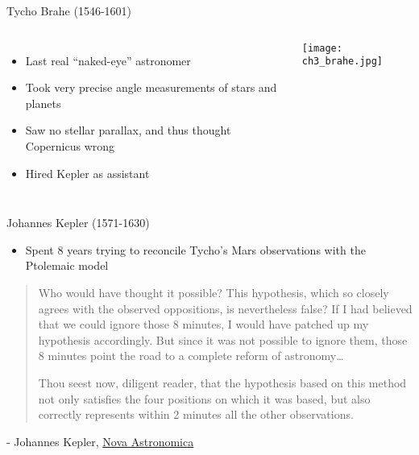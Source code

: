 \documentclass[pdf, aspectratio=169]{beamer}
\begin{document}
\begin{frame}{Tycho Brahe (1546-1601)}
  \begin{columns}
	\begin{itemize}
	  \item Last real ``naked-eye'' astronomer
	  \item Took very precise angle measurements of stars and planets
	  \item Saw no stellar parallax, and thus thought Copernicus wrong
	  \item Hired Kepler as assistant
	\end{itemize}
	\begin{center}
	  \texttt{[image: ch3\_brahe.jpg]}
	\end{center}
  \end{columns}
\end{frame}

\begin{frame}{Johannes Kepler (1571-1630)}
  \begin{itemize}
	\item Spent 8 years trying to reconcile Tycho's Mars observations with the Ptolemaic model
  \end{itemize}
  \begin{quotation}
	Who would have thought it possible? This
hypothesis, which so closely agrees with the
observed oppositions, is nevertheless false? If I
had believed that we could ignore those 8 minutes, I
would have patched up my hypothesis accordingly.
But since it was not possible to ignore them,
those 8 minutes point the road to a complete
reform of astronomy\ldots

Thou seest now, diligent reader, that the hypothesis
based on this method not only satisfies the four
positions on which it was based, but also
correctly represents within 2 minutes all the
other observations. 
  \end{quotation}
  \begin{flushright}
	- Johannes Kepler, \underline{Nova Astronomica}
  \end{flushright}
\end{frame}
\end{document}
